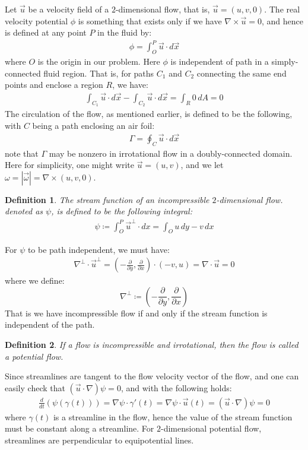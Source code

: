 \documentclass[11pt]{book}
\theoremstyle{break}
\theoremstyle{break}
\newtheorem{defn}{Definition}[corL]
\begin{document}
Let $\vec{u}$ be a velocity field of a $2$-dimensional flow, that is, $\vec{u} = (u,v,0)$. The real velocity potential $\phi$ is something that exists only if we have $\nabla \times \vec{u} = 0$, and hence is defined at any point $P$ in the fluid by:
\begin{align*}
\phi = \int_O^P \vec{u}\cdot d\vec{x}
\end{align*}
where $O$ is the origin in our problem. Here $\phi$ is independent of path in a simply-connected fluid region. That is, for paths $C_1$ and $C_2$ connecting the same end points and enclose a region $R$, we have:
\begin{align*}
\int_{C_1} \vec{u}\cdot d\vec{x} - \int_{C_2} \vec{u}\cdot d\vec{x} = \int_R 0\, dA = 0
\end{align*}
The circulation of the flow, as mentioned earlier, is defined to be the following, with $C$ being a path enclosing an air foil:
\begin{align*}
\Gamma  = \oint_C \vec{u}\cdot d\vec{x}
\end{align*}
note that $\Gamma$ may be nonzero in irrotational flow in a doubly-connected domain. \\

Here for simplicity, one might write $\vec{u} = (u,v)$, and we let $\omega = |\vec{\omega}| = \nabla \times (u,v,0)$.
\begin{defn}
The stream function of an incompressible $2$-dimensional flow. denoted as $\psi$, is defined to be the following integral:
\begin{align*}
\psi \coloneqq \int_O^P \vec{u}^{\perp} \cdot dx = \int_O u\,dy-v\,dx
\end{align*}
\end{defn}

For $\psi$ to be path independent, we must have:
\begin{align*}
\nabla^{\perp}\cdot \vec{u}^{\perp} = \left(- \frac{\partial}{\partial y}, \frac{\partial }{\partial x}\right) \cdot \left(-v, u\right) = \nabla \cdot \vec{u} =0 
\end{align*}
where we define:
$$\nabla^{\perp} \coloneqq \left( -\frac{\partial}{\partial y}, \frac{\partial}{\partial x}\right)$$ 
That is we have incompressible flow if and only if the stream function is independent of the path.

\begin{defn}
If a flow is incompressible and irrotational, then the flow is called a potential flow. 
\end{defn}
Since streamlines are tangent to the flow velocity vector of the flow, and one can easily check that $(\vec{u}\cdot \nabla) \psi = 0$, and with the following holds:
\begin{align*}
 \frac{d}{dt} \left(\psi(\gamma(t))\right) = \nabla \psi \cdot \gamma'(t) = \nabla \psi \cdot \vec{u}(t) = (\vec{u}\cdot \nabla) \psi = 0
\end{align*}
where $\gamma(t)$ is a streamline in the flow, hence the value of the stream function must be constant along a streamline. For $2$-dimensional potential flow, streamlines are perpendicular to equipotential lines. \\
\end{document}
